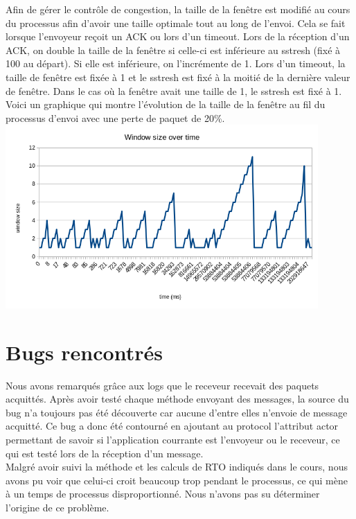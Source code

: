 \documentclass{article}
\begin{document}
Afin de gérer le contrôle de congestion, la taille de la fenêtre est modifié au cours du processus afin d'avoir une taille optimale tout au long de l'envoi.
Cela se fait lorsque l'envoyeur reçoit un ACK ou lors d'un timeout.
Lors de la réception d'un ACK, on double la taille de la fenêtre si celle-ci est inférieure au sstresh (fixé à 100 au départ). Si elle est inférieure, on l'incrémente de 1.
Lors d'un timeout, la taille de fenêtre est fixée à 1 et le sstresh est fixé à la moitié de la dernière valeur de fenêtre. Dans le cas où la fenêtre avait une taille de 1, le sstresh est fixé à 1.\\
Voici un graphique qui montre l'évolution de la taille de la fenêtre au fil du processus d'envoi avec une perte de paquet de 20\%. \\
\includegraphics[height=7cm]{ressources/windowChart.png}



\section{Bugs rencontrés}

Nous avons remarqués grâce aux logs que le receveur recevait des paquets acquittés. 
Après avoir testé chaque méthode envoyant des messages, la source du bug n'a toujours pas été découverte car aucune d'entre elles n'envoie de message acquitté. 
Ce bug a donc été contourné en ajoutant au protocol l'attribut actor permettant de savoir si l'application courrante est l'envoyeur ou le receveur, ce qui est testé lors de la réception d'un message.\\

Malgré avoir suivi la méthode et les calculs de RTO indiqués dans le cours, nous avons pu voir que celui-ci croit beaucoup trop pendant le processus, ce qui mène à un temps de processus disproportionné. Nous n'avons pas su déterminer l'origine de ce problème.\\
\end{document}
